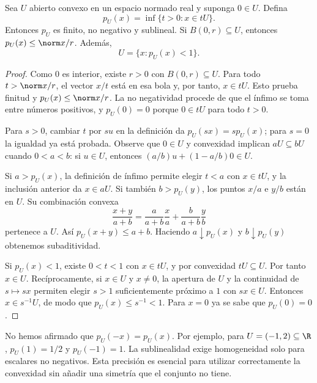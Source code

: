 \begin{lema}\label{ch24:minkowski}
Sea $U$ abierto convexo en un espacio normado real y suponga $0\in U$. Defina
\[
 p_U(x)=\inf\{t>0:x\in tU\}.
\]
Entonces $p_U$ es finito, no negativo y sublineal. Si $B(0,r)\subseteq U$, entonces $p_U(x)\leq\norm x/r$. Además,
\[U=\{x:p_U(x)<1\}.\]
\end{lema}
\begin{proof}
Como $0$ es interior, existe $r>0$ con $B(0,r)\subseteq U$. Para todo $t>\norm x/r$, el vector $x/t$ está en esa bola y, por tanto, $x\in tU$. Esto prueba finitud y $p_U(x)\leq\norm x/r$. La no negatividad procede de que el ínfimo se toma entre números positivos, y $p_U(0)=0$ porque $0\in tU$ para todo $t>0$.

Para $s>0$, cambiar $t$ por $su$ en la definición da $p_U(sx)=sp_U(x)$; para $s=0$ la igualdad ya está probada. Observe que $0\in U$ y convexidad implican $aU\subseteq bU$ cuando $0<a<b$: si $u\in U$, entonces $(a/b)u+(1-a/b)0\in U$.

Si $a>p_U(x)$, la definición de ínfimo permite elegir $t<a$ con $x\in tU$, y la inclusión anterior da $x\in aU$. Si también $b>p_U(y)$, los puntos $x/a$ e $y/b$ están en $U$. Su combinación convexa
\[
 \frac{x+y}{a+b}=\frac a{a+b}\frac xa+\frac b{a+b}\frac yb
\]
pertenece a $U$. Así $p_U(x+y)\leq a+b$. Haciendo $a\downarrow p_U(x)$ y $b\downarrow p_U(y)$ obtenemos subaditividad.

Si $p_U(x)<1$, existe $0<t<1$ con $x\in tU$, y por convexidad $tU\subseteq U$. Por tanto $x\in U$. Recíprocamente, si $x\in U$ y $x\ne0$, la apertura de $U$ y la continuidad de $s\mapsto sx$ permiten elegir $s>1$ suficientemente próximo a $1$ con $sx\in U$. Entonces $x\in s^{-1}U$, de modo que $p_U(x)\leq s^{-1}<1$. Para $x=0$ ya se sabe que $p_U(0)=0$.
\end{proof}

\begin{observacion}
No hemos afirmado que $p_U(-x)=p_U(x)$. Por ejemplo, para $U=(-1,2)\subseteq\R$, $p_U(1)=1/2$ y $p_U(-1)=1$. La sublinealidad exige homogeneidad solo para escalares no negativos. Esta precisión es esencial para utilizar correctamente la convexidad sin añadir una simetría que el conjunto no tiene.
\end{observacion}

